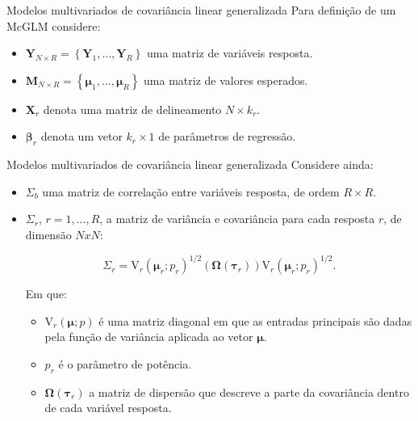 \documentclass[
  ignorenonframetext,
  serif,
  professionalfont,
  usenames,
  dvipsnames,
  aspectratio = 169]{beamer}
\begin{document}
\begin{frame}{Modelos multivariados de covariância linear generalizada}
\protect\hypertarget{modelos-multivariados-de-covariuxe2ncia-linear-generalizada-4}{}
Para definição de um McGLM considere:

\begin{itemize}
  
  \itemsep 2ex
  
  \item $\boldsymbol{Y}_{N \times R} = \left \{ \boldsymbol{Y}_1, \dots, \boldsymbol{Y}_R \right \}$ uma  matriz de variáveis resposta.
  
  \item $\boldsymbol{M}_{N \times R} = \left \{ \boldsymbol{\mu}_1, \dots, \boldsymbol{\mu}_R \right \}$ uma matriz de valores esperados.
  
    \item $\boldsymbol{X}_r$ denota uma matriz de delineamento $N \times k_r$.
  
  \item $\boldsymbol{\beta}_r$ denota um vetor $k_r \times 1$ de parâmetros de regressão.
  
\end{itemize}
\end{frame}

\begin{frame}{Modelos multivariados de covariância linear generalizada}
\protect\hypertarget{modelos-multivariados-de-covariuxe2ncia-linear-generalizada-5}{}
Considere ainda:

\begin{itemize}
  
  \itemsep 2ex
  
    \item $\Sigma_b$ uma matriz de correlação entre variáveis resposta, de ordem $R \times R$.
    
  \item $\Sigma_r$, $r = 1,..., R$, a matriz de variância e covariância para cada resposta $r$, de dimensão $NxN$:
  
$$
\Sigma_r = \mathrm{V}_r\left(\boldsymbol{\mu}_r; p_r\right)^{1/2}(\boldsymbol{\Omega}\left(\boldsymbol{\tau}_r\right))\mathrm{V}_r\left(\boldsymbol{\mu}_r; p_r\right)^{1/2}.
$$

Em que:

  \begin{itemize}
    \item $\mathrm{V}_r\left(\boldsymbol{\mu}; p\right)$ é uma matriz diagonal em que as entradas principais são dadas pela função de variância aplicada ao vetor $\boldsymbol{\mu}$. 
  
  \item $p_r$ é o parâmetro de potência. 
  
  \item $\boldsymbol{\Omega}\left(\boldsymbol{\tau}_r\right)$ a matriz de dispersão que descreve a parte da covariância dentro de cada variável resposta. 
  \end{itemize}
  
\end{itemize}
\end{frame}
\end{document}
